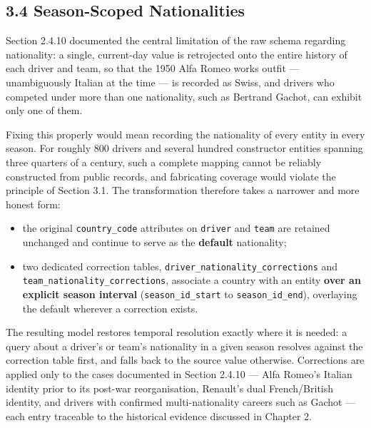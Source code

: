 \documentclass[
]{article}
\providecommand{\tightlist}{%
  \setlength{\itemsep}{0pt}\setlength{\parskip}{0pt}}
\begin{document}
\newpage

\subsection{3.4 Season-Scoped
Nationalities}\label{season-scoped-nationalities}

Section 2.4.10 documented the central limitation of the raw schema
regarding nationality: a single, current-day value is retrojected onto
the entire history of each driver and team, so that the 1950 Alfa Romeo
works outfit --- unambiguously Italian at the time --- is recorded as
Swiss, and drivers who competed under more than one nationality, such as
Bertrand Gachot, can exhibit only one of them.

Fixing this properly would mean recording the nationality of every
entity in every season. For roughly 800 drivers and several hundred
constructor entities spanning three quarters of a century, such a
complete mapping cannot be reliably constructed from public records, and
fabricating coverage would violate the principle of Section 3.1. The
transformation therefore takes a narrower and more honest form:

\begin{itemize}
\tightlist
\item
  the original \texttt{country\_code} attributes on \texttt{driver} and
  \texttt{team} are retained unchanged and continue to serve as the
  \textbf{default} nationality;
\item
  two dedicated correction tables,
  \texttt{driver\_nationality\_corrections} and
  \texttt{team\_nationality\_corrections}, associate a country with an
  entity \textbf{over an explicit season interval}
  (\texttt{season\_id\_start} to \texttt{season\_id\_end}), overlaying
  the default wherever a correction exists.
\end{itemize}

The resulting model restores temporal resolution exactly where it is
needed: a query about a driver's or team's nationality in a given season
resolves against the correction table first, and falls back to the
source value otherwise. Corrections are applied only to the cases
documented in Section 2.4.10 --- Alfa Romeo's Italian identity prior to
its post-war reorganisation, Renault's dual French/British identity, and
drivers with confirmed multi-nationality careers such as Gachot --- each
entry traceable to the historical evidence discussed in Chapter 2.

\begin{table}[!h]
\centering\begingroup\fontsize{8}{10}\selectfont

\endgroup{}
\end{table}
\end{document}
